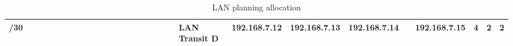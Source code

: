 \documentclass[11pt,a4paper]{report}
\begin{document}
\begin{table}[]
\begin{tabular}{rlllllllllllllllllllllllllll}
/30                                          &                      & \cellcolor[HTML]{9698ED} & \cellcolor[HTML]{9698ED} &                          &                          &                          &                          &                          &                          &                          &                          &                          &                          &                          &                          &                          &                          &  & LAN Transit D          & 192.168.7.12              & 192.168.7.13                      & 192.168.7.14                     &                          & 192.168.7.15                & 4                          & 2                         & 2                           \\ \hline
\end{tabular}
\caption{LAN planning allocation}
\label{tab:lanalloc}
\end{table}
\end{document}
